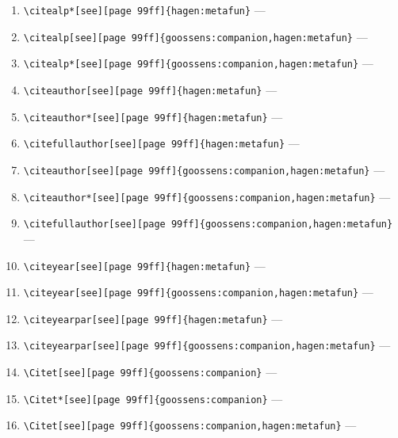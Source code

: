 \documentclass[12pt]{article}
\begin{document}
\begin{enumerate}
\verb|\citealp[see][page 99ff]{hagen:metafun}| ---
\citealp[see][page 99ff]{hagen:metafun}
\item
\verb|\citealp*[see][page 99ff]{hagen:metafun}| ---
\citealp*[see][page 99ff]{hagen:metafun}
\item
\verb|\citealp[see][page 99ff]{goossens:companion,hagen:metafun}| ---
\citealp[see][page 99ff]{goossens:companion,hagen:metafun}
\item
\verb|\citealp*[see][page 99ff]{goossens:companion,hagen:metafun}| ---
\citealp*[see][page 99ff]{goossens:companion,hagen:metafun}
\item
\verb|\citeauthor[see][page 99ff]{hagen:metafun}| ---
\citeauthor[see][page 99ff]{hagen:metafun}
\item
\verb|\citeauthor*[see][page 99ff]{hagen:metafun}| ---
\citeauthor*[see][page 99ff]{hagen:metafun}
\item
\verb|\citefullauthor[see][page 99ff]{hagen:metafun}| ---
\item
\verb|\citeauthor[see][page 99ff]{goossens:companion,hagen:metafun}| ---
\citeauthor[see][page 99ff]{goossens:companion,hagen:metafun}
\item
\verb|\citeauthor*[see][page 99ff]{goossens:companion,hagen:metafun}| ---
\citeauthor*[see][page 99ff]{goossens:companion,hagen:metafun}
\item
\verb|\citefullauthor[see][page 99ff]{goossens:companion,hagen:metafun}| ---
\item
\verb|\citeyear[see][page 99ff]{hagen:metafun}| ---
\citeyear[see][page 99ff]{hagen:metafun}
\item
\verb|\citeyear[see][page 99ff]{goossens:companion,hagen:metafun}| ---
\citeyear[see][page 99ff]{goossens:companion,hagen:metafun}
\item
\verb|\citeyearpar[see][page 99ff]{hagen:metafun}| ---
\citeyearpar[see][page 99ff]{hagen:metafun}
\item
\verb|\citeyearpar[see][page 99ff]{goossens:companion,hagen:metafun}| ---
\citeyearpar[see][page 99ff]{goossens:companion,hagen:metafun}
\item
\verb|\Citet[see][page 99ff]{goossens:companion}| ---
\item
\verb|\Citet*[see][page 99ff]{goossens:companion}| ---
\item
\verb|\Citet[see][page 99ff]{goossens:companion,hagen:metafun}| ---

\end{enumerate}
\end{document}
